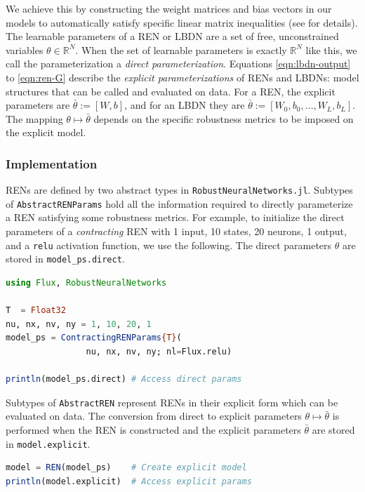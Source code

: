 We achieve this by constructing the weight matrices and bias vectors in our models to automatically satisfy specific linear matrix inequalities (see \cite{Revay++2023} for details). The learnable parameters of a REN or LBDN are a set of free, unconstrained variables $\theta \in \mathbb{R}^N$. When the set of learnable parameters is exactly $\mathbb{R}^N$ like this, we call the parameterization a \textit{direct parameterization}. Equations \ref{eqn:lbdn-output} to \ref{eqn:ren-G} describe the \textit{explicit parameterizations} of RENs and LBDNs: model structures that can be called and evaluated on data. For a REN, the explicit parameters are $\bar{\theta} := [W, b]$, and for an LBDN they are $\bar{\theta} := [W_0, b_0, \ldots, W_L, b_L]$. The mapping $\theta \mapsto \bar{\theta}$ depends on the specific robustness metrics to be imposed on the explicit model. 

\subsubsection{Implementation} \label{sec:params-implementation}
RENs are defined by two abstract types in \verb|RobustNeuralNetworks.jl|. Subtypes of \verb|AbstractRENParams| hold all the information required to directly parameterize a REN satisfying some robustness metrics. For example, to initialize the direct parameters of a \textit{contracting} REN with 1 input, 10 states, 20 neurons, 1 output, and a \texttt{relu} activation function, we use the following. The direct parameters $\theta$ are stored in \verb|model_ps.direct|. 

\begin{lstlisting}[language = Julia]
using Flux, RobustNeuralNetworks

T  = Float32
nu, nx, nv, ny = 1, 10, 20, 1
model_ps = ContractingRENParams{T}(
                nu, nx, nv, ny; nl=Flux.relu)
                
println(model_ps.direct) # Access direct params
\end{lstlisting}

Subtypes of \verb|AbstractREN| represent RENs in their explicit form which can be evaluated on data. The conversion from direct to explicit parameters $\theta \mapsto \bar{\theta}$ is performed when the REN is constructed and the explicit parameters $\bar{\theta}$ are stored in \verb|model.explicit|.

\begin{lstlisting}[language = Julia]
model = REN(model_ps)    # Create explicit model
println(model.explicit)  # Access explicit params
\end{lstlisting}

